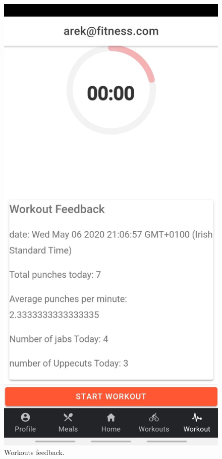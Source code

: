 \documentclass[a4paper,12pt]{report}
\begin{document}
\begin{figure}[ht]
\begin{center}
\begin{minipage}[b]{0.5\linewidth}
    \includegraphics[width=.7\linewidth]{images/aplicationImages/workoutFeedback.jpeg} 
    \caption{Workouts feedback.} 
    \vspace{4ex}
  \end{minipage}%
  \end{center}
\end{figure}
\end{document}
